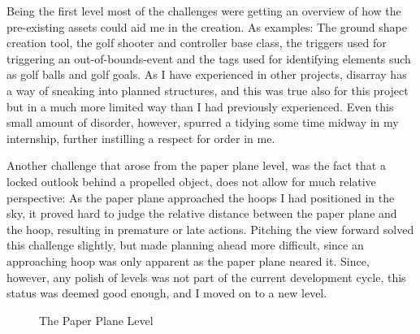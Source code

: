 Being the first level most of the challenges were getting an overview of how the pre-existing assets could aid me in the creation. As examples: The ground shape creation tool, the golf shooter and controller base class, the triggers used for triggering an out-of-bounds-event and the tags used for identifying elements such as golf balls and golf goals. As I have experienced in other projects, disarray has a way of sneaking into planned structures, and this was true also for this project but in a much more limited way than I had previously experienced. Even this small amount of disorder, however, spurred a tidying some time midway in my internship, further instilling a respect for order in me.

Another challenge that arose from the paper plane level, was the fact that a locked outlook behind a propelled object, does not allow for much relative perspective: As the paper plane approached the hoops I had positioned in the sky, it proved hard to judge the relative distance between the paper plane and the hoop, resulting in premature or late actions. Pitching the view forward solved this challenge slightly, but made planning ahead more difficult, since an approaching hoop was only apparent as the paper plane neared it. Since, however, any polish of levels was not part of the current development cycle, this status was deemed good enough, and I moved on to a new level.
\begin{center}
  \begin{figure}[!htb]
    \noindent{}
    \caption{The Paper Plane Level}
    \label{PaperPlane}
  \end{figure}
\end{center}
